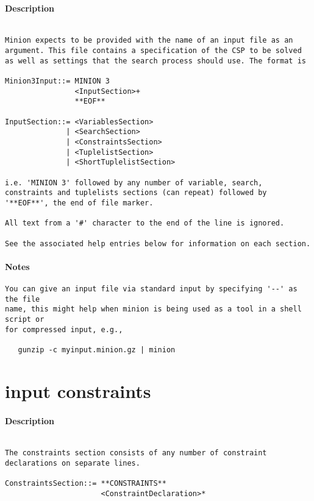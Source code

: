 \paragraph{Description}
{\footnotesize
\begin{verbatim}

Minion expects to be provided with the name of an input file as an
argument. This file contains a specification of the CSP to be solved
as well as settings that the search process should use. The format is

Minion3Input::= MINION 3
                <InputSection>+
                **EOF**

InputSection::= <VariablesSection>
              | <SearchSection>
              | <ConstraintsSection>
              | <TuplelistSection>
              | <ShortTuplelistSection>

i.e. 'MINION 3' followed by any number of variable, search,
constraints and tuplelists sections (can repeat) followed by
'**EOF**', the end of file marker.

All text from a '#' character to the end of the line is ignored.

See the associated help entries below for information on each section.
\end{verbatim}
}
\paragraph{Notes}
{\footnotesize
\begin{verbatim}
You can give an input file via standard input by specifying '--' as the file
name, this might help when minion is being used as a tool in a shell script or
for compressed input, e.g.,

   gunzip -c myinput.minion.gz | minion
\end{verbatim}
}
\section{input constraints}
\paragraph{Description}
{\footnotesize
\begin{verbatim}

The constraints section consists of any number of constraint
declarations on separate lines.

ConstraintsSection::= **CONSTRAINTS**
                      <ConstraintDeclaration>*
\end{verbatim}
}
